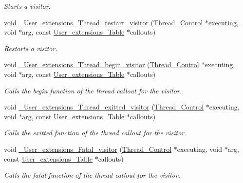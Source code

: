\begin{DoxyCompactItemize}
\begin{DoxyCompactList}\small\item\em Starts a visitor. \end{DoxyCompactList}\item 
void \mbox{\hyperlink{group__RTEMSScoreUserExt_ga2dcb30df10fb5c296246f8c259789112}{\+\_\+\+User\+\_\+extensions\+\_\+\+Thread\+\_\+restart\+\_\+visitor}} (\mbox{\hyperlink{struct__Thread__Control}{Thread\+\_\+\+Control}} $\ast$executing, void $\ast$arg, const \mbox{\hyperlink{structUser__extensions__Table}{User\+\_\+extensions\+\_\+\+Table}} $\ast$callouts)
\begin{DoxyCompactList}\small\item\em Restarts a visitor. \end{DoxyCompactList}\item 
void \mbox{\hyperlink{group__RTEMSScoreUserExt_ga6dde9d38facceb09a17dfd2231762ae3}{\+\_\+\+User\+\_\+extensions\+\_\+\+Thread\+\_\+begin\+\_\+visitor}} (\mbox{\hyperlink{struct__Thread__Control}{Thread\+\_\+\+Control}} $\ast$executing, void $\ast$arg, const \mbox{\hyperlink{structUser__extensions__Table}{User\+\_\+extensions\+\_\+\+Table}} $\ast$callouts)
\begin{DoxyCompactList}\small\item\em Calls the begin function of the thread callout for the visitor. \end{DoxyCompactList}\item 
void \mbox{\hyperlink{group__RTEMSScoreUserExt_ga8212ce5f17f5b1c493fe9c5d842f6204}{\+\_\+\+User\+\_\+extensions\+\_\+\+Thread\+\_\+exitted\+\_\+visitor}} (\mbox{\hyperlink{struct__Thread__Control}{Thread\+\_\+\+Control}} $\ast$executing, void $\ast$arg, const \mbox{\hyperlink{structUser__extensions__Table}{User\+\_\+extensions\+\_\+\+Table}} $\ast$callouts)
\begin{DoxyCompactList}\small\item\em Calls the exitted function of the thread callout for the visitor. \end{DoxyCompactList}\item 
void \mbox{\hyperlink{group__RTEMSScoreUserExt_ga5eca481e26b6a04851ec4ca1c65c81c1}{\+\_\+\+User\+\_\+extensions\+\_\+\+Fatal\+\_\+visitor}} (\mbox{\hyperlink{struct__Thread__Control}{Thread\+\_\+\+Control}} $\ast$executing, void $\ast$arg, const \mbox{\hyperlink{structUser__extensions__Table}{User\+\_\+extensions\+\_\+\+Table}} $\ast$callouts)
\begin{DoxyCompactList}\small\item\em Calls the fatal function of the thread callout for the visitor. \end{DoxyCompactList}\item 

\end{DoxyCompactItemize}
